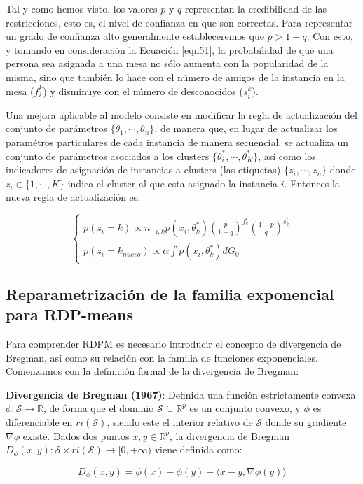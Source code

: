 Tal y como hemos visto, los valores $p$ y $q$ representan la credibilidad de las restricciones, esto es, el nivel de confianza en que son correctas. Para representar un grado de confianza alto generalmente estableceremos que $p > 1 - q$. Con esto, y tomando en consideración la Ecuación \ref{eqn51}, la probabilidad de que una persona sea asignada a una mesa no sólo aumenta con la popularidad de la misma, sino que también lo hace con el número de amigos de la instancia en la mesa ($f_{i}^k$) y disminuye con el número de desconocidos ($s_{i}^k$).

Una mejora aplicable al modelo consiste en modificar la regla de actualización del conjunto de parámetros $ \{\theta_1, \cdots, \theta_n\}$, de manera que, en lugar de actualizar los paramétros particulares de cada instancia de manera secuencial, se actualiza un conjunto de parámetros asociados a los clusters $\{\theta_i^*, \cdots, \theta_K^*\}$, así como los indicadores de asignación de instancias a clusters (las etiquetas) $\{z_i, \cdots, z_n\}$ donde $z_i\in \{1, \cdots, K\}$ indica el cluster al que esta asignado la instancia $i$. Entonces la nueva regla de actualización es:

\begin{equation}
\begin{cases}
p(z_i = k) \varpropto n_{-i,k}p(x_i,\theta_k^*)\left(\frac{p}{1-q}\right)^{f_{k}^i} \left(\frac{1-p}{q}\right)^{s_{k}^i} \\
p(z_i = k_{nuevo}) \varpropto \alpha \int p(x_i,\theta_k^*)dG_0
\end{cases}
\label{eqn53}
\end{equation}

\subsection{Reparametrización de la familia exponencial para RDP-means}

Para comprender \acf{RDPM} es necesario introducir el concepto de divergencia de Bregman, así como su relación con la familia de funciones exponenciales. Comenzamos con la definición formal de la divergencia de Bregman:

\begin{definicion}
	
	\textbf{Divergencia de Bregman (1967)}: Definida una función estrictamente convexa $\phi: \mathcal{S} \rightarrow \mathbb{R}$, de forma que el dominio $\mathcal{S} \subseteq \mathbb{R}^p$ es un conjunto convexo, y $\phi$ es diferenciable en $ri(\mathcal{S})$, siendo este el interior relativo de $\mathcal{S}$ donde su gradiente $\nabla \phi$ existe. Dados dos puntos $x,y \in \mathbb{R}^p$, la divergencia de Bregman $D_{\phi}(x,y): \mathcal{S} \times ri(\mathcal{S}) \rightarrow [0, + \infty)$ viene definida como: \cite{RDPM:2015}
	
	$$ D_{\phi}(x,y) = \phi(x) - \phi(y) - \langle x - y, \nabla \phi(y)  \rangle $$
	
\end{definicion}

